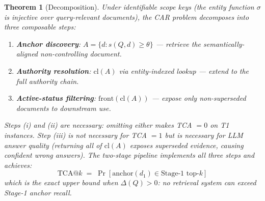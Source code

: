 \documentclass[11pt]{article}
\newtheorem{theorem}{Theorem}
\begin{document}
\setcounter{theorem}{2}
\begin{theorem}[Decomposition]
\label{thm:optimality}
Under identifiable scope keys (the entity function $\sigma$ is injective over query-relevant documents), the CAR problem decomposes into three composable steps:
\begin{enumerate}[noitemsep,label=(\roman*)]
  \item \textbf{Anchor discovery}: $A = \{d : s(Q,d) \geq \theta\}$ --- retrieve the semantically-aligned non-controlling document.
  \item \textbf{Authority resolution}: $\mathrm{cl}(A)$ via entity-indexed lookup --- extend to the full authority chain.
  \item \textbf{Active-status filtering}: $\mathrm{front}(\mathrm{cl}(A))$ --- expose only non-superseded documents to downstream use.
\end{enumerate}
Steps (i) and (ii) are \emph{necessary}: omitting either makes TCA $= 0$ on T1 instances. Step (iii) is not necessary for TCA $= 1$ but is necessary for LLM answer quality (returning all of $\mathrm{cl}(A)$ exposes superseded evidence, causing confident wrong answers). The two-stage pipeline implements all three steps and achieves:
\[
  \text{TCA@}k \;=\; \Pr[\text{anchor}(d_1) \in \text{Stage-1 top-}k]
\]
which is the exact upper bound when $\Delta(Q) > 0$: no retrieval system can exceed Stage-1 anchor recall.
\end{theorem}
\end{document}
